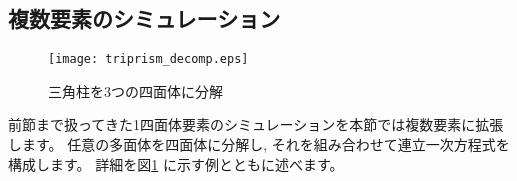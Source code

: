 \subsection{複数要素のシミュレーション}

\begin{figure}[b]
\begin{center}
\texttt{[image: triprism\_decomp.eps]}
\caption{三角柱を3つの四面体に分解}
\label{fig:triprism_decomp}
\end{center}
\end{figure}

前節まで扱ってきた1四面体要素のシミュレーションを本節では複数要素に拡張します。
任意の多面体を四面体に分解し,
それを組み合わせて連立一次方程式を構成します。
詳細を図\ref{fig:triprism_decomp}
に示す例とともに述べます。

